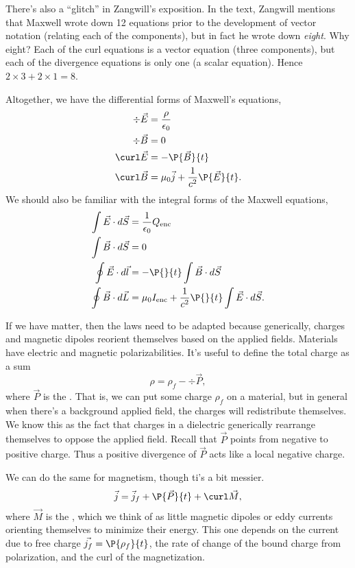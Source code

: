There's also a ``glitch'' in Zangwill's exposition. In the text, Zangwill mentions that Maxwell wrote down 12 equations prior to the development of vector notation (relating each of the components), but in fact he wrote down \emph{eight}. Why eight? Each of the curl equations is a vector equation (three components), but each of the divergence equations is only one (a scalar equation). Hence $2\times 3 + 2\times 1 = 8$.

Altogether, we have the differential forms of Maxwell's equations,
\begin{align}
    \div \vec{E} &= \frac{\rho}{\epsilon_0}\\
    \div \vec{B} &= 0\\
    \curl \vec{E} &= -\P{\vec{B}}{t}\\
    \curl \vec{B} &= \mu_0\vec{j} + \frac{1}{c^2}\P{\vec{E}}{t}.
\end{align}
%
We should also be familiar with the integral forms of the Maxwell equations,
\begin{align}
    \int \vec{E} \cdot d\vec{S} &= \frac{1}{\epsilon_0} Q_\text{enc}\\
    \int \vec{B} \cdot d\vec{S} &=0\\
    \oint \vec{E} \cdot d\vec{l} &= -\P{}{t} \int \vec{B} \cdot d\vec{S}\\
    \oint \vec{B} \cdot d\vec{L} &= \mu_0 I_\text{enc}+ \frac{1}{c^2} \P{}{t}\int \vec{E} \cdot d\vec{S}.
\end{align}

If we have matter, then the laws need to be adapted because generically, charges and magnetic dipoles reorient themselves based on the applied fields. Materials have electric and magnetic polarizabilities. It's useful to define the total charge as a sum
\begin{equation}
    \rho = \rho_f - \div \vec{P},
\end{equation}
where $\vec{P}$ is the . That is, we can put some charge $\rho_f$ on a material, but in general when there's a background applied field, the charges will redistribute themselves. We know this as the fact that charges in a dielectric generically rearrange themselves to oppose the applied field. Recall that $\vec{P}$ points from negative to positive charge. Thus a positive divergence of $\vec{P}$ acts like a local negative charge.

We can do the same for magnetism, though ti's a bit messier.
\begin{equation}
    \vec{j} = \vec{j}_f + \P{\vec{P}}{t}+ \curl \vec{M},
\end{equation}
where $\vec{M}$ is the , which we think of as little magnetic dipoles or eddy currents orienting themselves to minimize their energy. This one depends on the current due to free charge $\vec{j_f} = \P{\rho_f}{t}$, the rate of change of the bound charge from polarization, and the curl of the magnetization.

